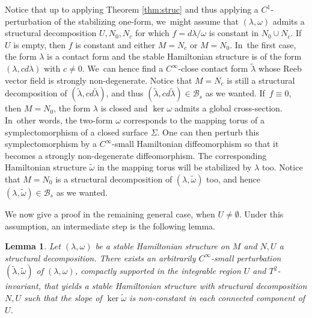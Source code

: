 \documentclass[10pt]{amsart}
\newtheorem{lemma}[theorem]{Lemma}
\theoremstyle{definition}
\begin{document}
Notice that up to applying Theorem \ref{thm:struc} and thus applying a $C^1$-perturbation of the stabilizing one-form, we~might assume that $(\lambda,\omega)$ admits a structural decomposition $U, N_0, N_c$ for which $f=d\lambda/\omega$ is constant in $N_0\cup N_c$. If~$U$ is empty, then $f$ is constant and either $M=N_c$ or $M=N_0$. In~the first case, the form $\lambda$ is a contact form and the stable Hamiltonian structure is of the form $(\lambda, cd\lambda)$ with $c\neq 0$. We~can hence find a $C^\infty$-close contact form $\widetilde \lambda$ whose Reeb vector field is strongly non-degenerate. Notice that $M=N_c$ is still a structural decomposition of $(\tilde \lambda, cd\tilde \lambda)$, and thus $(\tilde \lambda, cd\tilde \lambda) \in \mathcal{B}_s$ as we wanted. If~$f\equiv 0$, then $M=N_0$, the form $\lambda$ is closed and $\ker \omega$ admits a global cross-section. In~other words, the two-form $\omega$ corresponds to the mapping torus of a symplectomorphism of a closed surface $\Sigma$. One can then perturb this symplectomorphism by a $C^\infty$-small Hamiltonian diffeomorphism so that it becomes a strongly non-degenerate diffeomorphism. The corresponding Hamiltonian structure $\tilde \omega$ in the mapping torus will be stabilized by $\lambda$ too. Notice that $M=N_0$ is a structural decomposition of $(\lambda, \tilde \omega)$ too, and hence $(\lambda,\tilde \omega)\in \mathcal{B}_s$ as we wanted.

We now give a proof in the remaining general case, \ie when $U\neq \emptyset$. Under this assumption, an intermediate step is the following lemma.

\begin{lemma}\label{lem:nonconstantslope}
Let $(\lambda,\omega)$ be a stable Hamiltonian structure on $M$ and $N,U$ a structural decomposition. There exists an arbitrarily $C^\infty$-small perturbation $(\widetilde \lambda,\widetilde \omega)$ of $(\lambda,\omega)$, compactly supported in the integrable region $U$ and $T^2$-invariant, that yields a stable Hamiltonian structure with structural decomposition $N,U$ such that the slope of $\ker \widetilde \omega$ is non-constant in each connected component of $U$.
\end{lemma}
\end{document}
